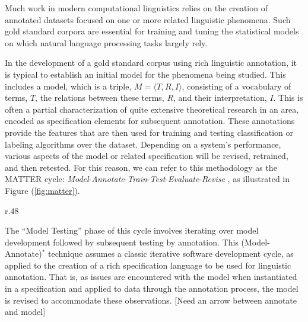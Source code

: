 \documentclass[10pt]{article}
\begin{document}
Much work in modern computational linguistics relies on the creation of annotated datasets focused on one or more related linguistic phenomena. Such gold standard corpora are essential for training and tuning the statistical models on which natural language processing tasks largely rely.

In the development of a gold standard corpus using rich linguistic annotation, it is typical to establish an initial model for the phenomena being studied. This includes a model, which is a triple, $M = \langle T,R,I \rangle$, consisting of a vocabulary of terms, $T$, the relations between these terms, $R$, and their interpretation,
$I$. This is often a partial characterization of quite extensive theoretical research in an area, encoded as specification elements for subsequent annotation. These annotations provide the features that are then used for training and testing classification or labeling algorithms over the dataset. Depending on a system's performance, various aspects of the model or related specification will be revised, retrained, and then retested. 
For this reason, we can refer to this methodology as the MATTER cycle: {\it Model}-{\it Annotate}-{\it Train}-{\it Test}-{\it Evaluate}-{\it Revise}  \cite{pustejovsky2012natural}, as illustrated in Figure (\ref{fig:matter}). 

\begin{wrapfigure}{r}{.48\textwidth}
\vspace {-9mm}

  \centering
  \vspace {-4mm}
  \caption{The \textsc{matter} Methodology}
  \label{fig:matter}

  \vspace {-2mm}

\end{wrapfigure}

The ``Model Testing'' phase of this cycle involves iterating over model development followed by subsequent testing by annotation. This  (Model-Annotate)$^*$ technique assumes a classic iterative software development cycle, as applied to the creation of a rich specification language to be used for linguistic annotation.  That is, as issues are encountered with the model when instantiated in a specification and applied to data through the annotation process, the model is revised to accommodate these observations. [Need an arrow between annotate and model]
\end{document}
